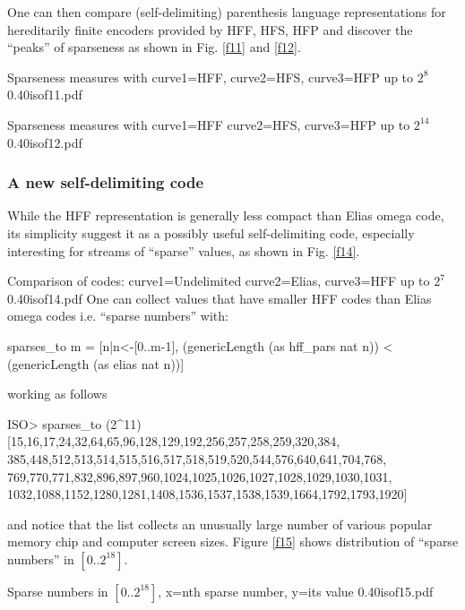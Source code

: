 \documentclass[]{INCLUDES/llncs}
\begin{document}
One can then compare (self-delimiting) parenthesis language representations for
hereditarily finite encoders provided by HFF, HFS, HFP and discover the
``peaks'' of sparseness as shown in Fig. \ref{f11} and \ref{f12}.

{Sparseness measures with curve1=HFF, curve2=HFS, curve3=HFP up to $2^8$} 
{0.40}{isof11.pdf}

{Sparseness measures with curve1=HFF curve2=HFS, curve3=HFP up to $2^{14}$} 
{0.40}{isof12.pdf}
 
\subsubsection{A new self-delimiting code}

While the HFF representation is generally less compact than Elias omega code,
its simplicity suggest it as a possibly useful self-delimiting code,
especially interesting for streams of ``sparse'' values, as shown in Fig.
\ref{f14}.

{Comparison of codes: curve1=Undelimited curve2=Elias, curve3=HFF up to $2^{7}$} 
{0.40}{isof14.pdf}
One can collect values that have smaller HFF codes than Elias omega codes i.e.
``sparse numbers'' with:
\begin{code}
sparses_to m = [n|n<-[0..m-1],
  (genericLength (as hff_pars nat n)) 
  <
  (genericLength (as elias nat n))]
\end{code}
working as follows
\begin{codex}
ISO> sparses_to (2^11)
[15,16,17,24,32,64,65,96,128,129,192,256,257,258,259,320,384,
 385,448,512,513,514,515,516,517,518,519,520,544,576,640,641,704,768,
 769,770,771,832,896,897,960,1024,1025,1026,1027,1028,1029,1030,1031,
 1032,1088,1152,1280,1281,1408,1536,1537,1538,1539,1664,1792,1793,1920]
\end{codex}
and notice that the list collects an unusually large number of various popular
memory chip and computer screen sizes. Figure \ref{f15} shows distribution of
``sparse numbers'' in $[0..2^{18}]$.

{Sparse numbers in $[0..2^{18}]$, x=nth sparse number, y=its value} 
{0.40}{isof15.pdf}
\end{document}
